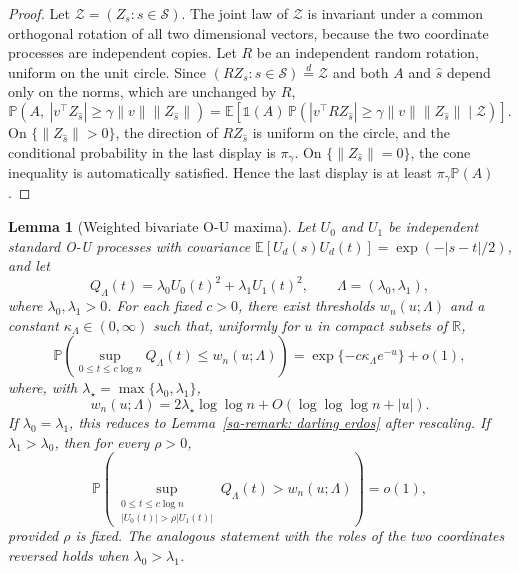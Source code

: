 \documentclass[10pt]{article}
\def\E{\mathbb{E}}
\def\P{\mathbb{P}}
\def\reals{\mathbb{R}}
\newcommand{\Indicator}{\mathds{1}}
\newtheorem{lemma}[theorem]{Lemma}
\theoremstyle{definition}
\theoremstyle{remark}
\begin{document}
\begin{proof}
Let $\mathcal Z=(Z_s:s\in\mathcal S)$. The joint law of $\mathcal Z$ is invariant under a common orthogonal rotation of all two dimensional vectors, because the two coordinate processes are independent copies. Let $R$ be an independent random rotation, uniform on the unit circle. Since $(RZ_s:s\in\mathcal S)\stackrel{d}{=}\mathcal Z$ and both $A$ and $\hat s$ depend only on the norms, which are unchanged by $R$,
\[
    \P\!\left(
        A,\ |v^\top Z_{\hat s}|\geq \gamma\|v\|\|Z_{\hat s}\|
    \right)
    =
    \E\!\left[
        \Indicator(A)\,
        \P\!\left(
            |v^\top R Z_{\hat s}|\geq \gamma\|v\|\|Z_{\hat s}\|
            \mid \mathcal Z
        \right)
    \right].
\]
On $\{\|Z_{\hat s}\|>0\}$, the direction of $RZ_{\hat s}$ is uniform on the circle, and the conditional probability in the last display is $\pi_\gamma$. On $\{\|Z_{\hat s}\|=0\}$, the cone inequality is automatically satisfied. Hence the last display is at least $\pi_\gamma\P(A)$.
\end{proof}

\begin{lemma}[Weighted bivariate O-U maxima]\label{sa-lem:weighted-ou-maximum}
Let $U_0$ and $U_1$ be independent standard O-U processes with covariance
$\E[U_d(s)U_d(t)]=\exp(-|s-t|/2)$, and let
\[
    Q_\Lambda(t)=\lambda_0U_0(t)^2+\lambda_1U_1(t)^2,
    \qquad
    \Lambda=(\lambda_0,\lambda_1),
\]
where $\lambda_0,\lambda_1>0$. For each fixed $c>0$, there exist thresholds
$w_n(u;\Lambda)$ and a constant $\kappa_\Lambda\in(0,\infty)$ such that,
uniformly for $u$ in compact subsets of $\reals$,
\[
    \P\left(
        \sup_{0\leq t\leq c\log n} Q_\Lambda(t)
        \leq
        w_n(u;\Lambda)
    \right)
    =
    \exp\{-c\kappa_\Lambda e^{-u}\}+o(1),
\]
where, with $\lambda_\star=\max\{\lambda_0,\lambda_1\}$,
\[
    w_n(u;\Lambda)
    =
    2\lambda_\star\log\log n
    +
    O(\log\log\log n+|u|).
\]
If $\lambda_0=\lambda_1$, this reduces to Lemma~\ref{sa-remark: darling erdos}
after rescaling. If $\lambda_1>\lambda_0$, then for every $\rho>0$,
\[
    \P\left(
        \sup_{\substack{0\leq t\leq c\log n\\ |U_0(t)|>\rho |U_1(t)|}}
        Q_\Lambda(t)
        >
        w_n(u;\Lambda)
    \right)
    =
    o(1),
\]
provided $\rho$ is fixed. The analogous statement with the roles of the two
coordinates reversed holds when $\lambda_0>\lambda_1$.
\end{lemma}
\end{document}
